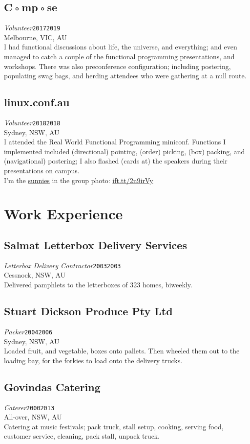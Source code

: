 \documentclass[12pt,a4paper,oneside]{article}
\newcommand{\xp}[6]{{\normalsize\textit{#1}\hfill\texttt{#5}\\\phantom{menace}\hfill#2, #3, #4}\\}
\newcommand{\textapprox}{\raisebox{0.5ex}{\texttildelow}}
\begin{document}
\subsection{C◦mp◦se}
\xp{Volunteer}{Melbourne}{VIC}{AU}{2017\textapprox{}2019}
\\I had functional discussions about life, the universe, and everything; and even managed to catch a couple of the functional programming presentations, and workshops. There was also preconference configuration; including postering, populating swag bags, and herding attendees who were gathering at a null route.
\subsection{linux.conf.au}
\xp{Volunteer}{Sydney}{NSW}{AU}{2018\textapprox{}2018}
\\I attended the Real World Functional Programming miniconf. Functions I implemented included (directional) pointing, (order) picking, (box) packing, and (navigational) postering; I also flashed (cards at) the speakers during their presentations on campus.
\\I'm the \href{https://www.flickr.com/photos/superroach/24972750417/}{sunnies} in the group photo: \href{https://twitter.com/developerjack/status/956790324126511104}{ift.tt/2n9irVy}

\section{Work Experience}
\subsection{Salmat Letterbox Delivery Services}
\xp{Letterbox Delivery Contractor}{Cessnock}{NSW}{AU}{2003\textapprox{}2003}
\\Delivered pamphlets to the letterboxes of 323 homes, biweekly.
\subsection{Stuart Dickson Produce Pty Ltd}
\xp{Packer}{Sydney}{NSW}{AU}{2004\textapprox{}2006}
\\Loaded fruit, and vegetable, boxes onto pallets. Then wheeled them out to the loading bay, for the forkies to load onto the delivery trucks.
\subsection{Govindas Catering}
\xp{Caterer}{All-over}{NSW}{AU}{2000\textapprox{}2013}
\\Catering at music festivals; pack truck, stall setup, cooking, serving food, customer service, cleaning, pack stall, unpack truck.
\end{document}
